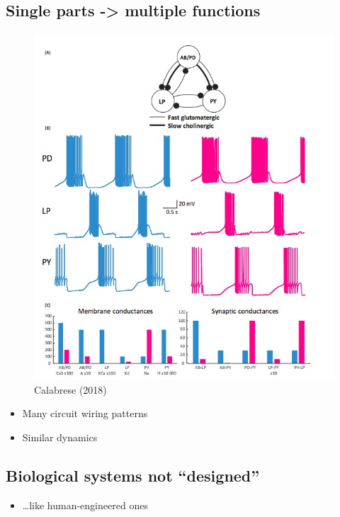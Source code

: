 \documentclass[
  letterpaper,
  DIV=11,
  numbers=noendperiod]{scrartcl}
\providecommand{\tightlist}{%
  \setlength{\itemsep}{0pt}\setlength{\parskip}{0pt}}\usepackage{longtable,booktabs,array}
\begin{document}
\subsection{Single parts -\textgreater{} multiple
functions}\label{single-parts---multiple-functions}

\begin{figure}[H]

{\centering \includegraphics[width=0.6\linewidth,height=\textheight,keepaspectratio]{../include/img/calabrese-2018.jpg}

}

\caption{Calabrese (2018)}

\end{figure}%

\begin{itemize}
\tightlist
\item
  Many circuit wiring patterns
\item
  Similar dynamics
\end{itemize}

\subsection{Biological systems not
``designed''}\label{biological-systems-not-designed}

\begin{itemize}
\tightlist
\item
  \ldots like human-engineered ones
\end{itemize}
\end{document}
